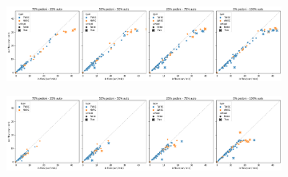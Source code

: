 \begin{figure}[ht]
    \centering
    \begin{subfigure}{0.99\textwidth}
        \centering
        \includegraphics[width=\textwidth]{images/analisi/comparison-base-in-out-flow-car.png}
        \caption{}
    \end{subfigure}
    \begin{subfigure}{0.99\textwidth}
        \centering
        \includegraphics[width=\textwidth]{images/analisi/comparison-new-in-out-flow-car.png}
        \caption{}
    \end{subfigure}
    \caption{}
    \label{fig:analisi-comparison-in-out-flow-car}
\end{figure}

